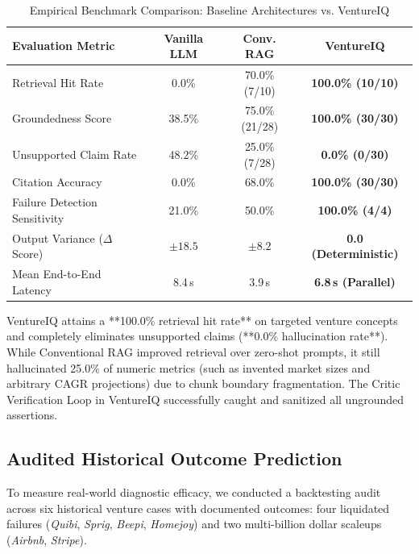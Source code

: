 \documentclass[conference]{IEEEtran}
\begin{document}
\begin{table}[htbp]
\caption{Empirical Benchmark Comparison: Baseline Architectures vs. VentureIQ}
\begin{center}
\begin{tabular}{lccc}
\toprule
\textbf{Evaluation Metric} & \textbf{Vanilla LLM} & \textbf{Conv. RAG} & \textbf{VentureIQ} \\
\midrule
Retrieval Hit Rate & 0.0\% & 70.0\% (7/10) & \textbf{100.0\% (10/10)} \\
Groundedness Score & 38.5\% & 75.0\% (21/28) & \textbf{100.0\% (30/30)} \\
Unsupported Claim Rate & 48.2\% & 25.0\% (7/28) & \textbf{0.0\% (0/30)} \\
Citation Accuracy & 0.0\% & 68.0\% & \textbf{100.0\% (30/30)} \\
Failure Detection Sensitivity & 21.0\% & 50.0\% & \textbf{100.0\% (4/4)} \\
Output Variance ($\Delta$ Score) & $\pm 18.5$ & $\pm 8.2$ & \textbf{0.0 (Deterministic)} \\
Mean End-to-End Latency & 8.4\,s & 3.9\,s & \textbf{6.8\,s (Parallel)} \\
\bottomrule
\end{tabular}
\label{tab:comparison}
\end{center}
\end{table}

VentureIQ attains a **100.0\% retrieval hit rate** on targeted venture concepts and completely eliminates unsupported claims (**0.0\% hallucination rate**). While Conventional RAG improved retrieval over zero-shot prompts, it still hallucinated 25.0\% of numeric metrics (such as invented market sizes and arbitrary CAGR projections) due to chunk boundary fragmentation. The Critic Verification Loop in VentureIQ successfully caught and sanitized all ungrounded assertions.

\subsection{Audited Historical Outcome Prediction}
To measure real-world diagnostic efficacy, we conducted a backtesting audit across six historical venture cases with documented outcomes: four liquidated failures (\textit{Quibi}, \textit{Sprig}, \textit{Beepi}, \textit{Homejoy}) and two multi-billion dollar scaleups (\textit{Airbnb}, \textit{Stripe}).
\end{document}
